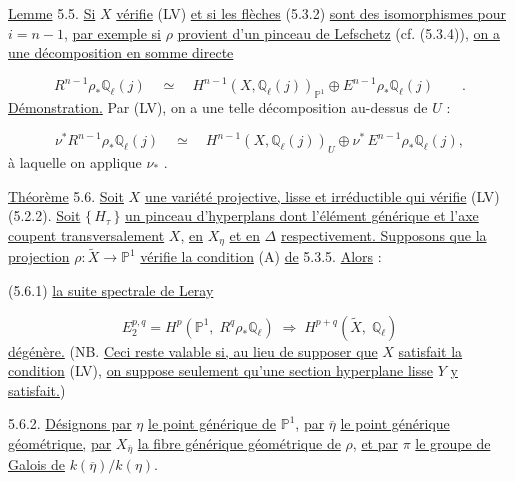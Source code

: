 \underline{Lemme} 5.5. \underline{Si} $X$ \underline{vérifie} (LV) \underline{et si les flèches} (5.3.2) \underline{sont des isomorphismes pour} $i = n - 1$, \underline{par exemple si} $\rho$ \underline{provient d'un pinceau de Lefschetz} (cf. (5.3.4)), \underline{on a une décomposition en somme directe}

\begin{equation}\tag{5.5.1}
R^{n-1}\rho_*\mathbb{Q}_\ell(j) \quad \simeq \quad H^{n-1}(X,\mathbb{Q}_\ell(j))_{\mathbb{P}^1} \oplus E^{n-1}\rho_*\mathbb{Q}_\ell(j) \qquad .
\end{equation}
\underline{Démonstration.} Par (LV), on a une telle décomposition au-dessus de $U$ :

\begin{equation}\tag{5.5.2}
\nu^*R^{n-1}\rho_*\mathbb{Q}_\ell(j) \quad \simeq \quad H^{n-1}(X,\mathbb{Q}_\ell(j))_U \oplus \nu^*\, E^{n-1}\rho_*\mathbb{Q}_\ell(j),
\end{equation}
à laquelle on applique $\nu_*$ .

\underline{Théorème} 5.6. \underline{Soit} $X$ \underline{une variété projective, lisse et irréductible qui vérifie} (LV) (5.2.2). \underline{Soit} $\{\, H_\tau \,\}$ \underline{un pinceau d'hyperplans dont l'élément générique et l'axe coupent transversalement} $X$, \underline{en} $X_\eta$ \underline{et en} $\Delta$ \underline{respectivement. Supposons que la projection} $\rho : \widetilde{X} \longrightarrow \mathbb{P}^1$ \underline{vérifie la condition} (A) \underline{de} 5.3.5. \underline{Alors} :

(5.6.1) \quad \underline{la suite spectrale de Leray}

\begin{equation*}
E_2^{p,q} = H^p(\mathbb{P}^1,\; R^q\rho_*\mathbb{Q}_\ell) \;\Longrightarrow\; H^{p+q}(\widetilde{X},\; \mathbb{Q}_\ell)
\end{equation*}
\underline{dégénère.} (NB. \underline{Ceci reste valable si, au lieu de supposer que} $X$ \underline{satisfait la condition} (LV), \underline{on suppose seulement qu'une section hyperplane lisse} $Y$ \underline{y satisfait.})



5.6.2. \underline{Désignons par} $\eta$ \underline{le point générique de} $\mathbb{P}^1$, \underline{par} $\overline{\eta}$ \underline{le point générique géométrique,} \underline{par} $X_{\overline{\eta}}$ \underline{la fibre générique géométrique de} $\rho$, \underline{et par} $\pi$ \underline{le groupe de Galois de} $k(\overline{\eta})/k(\eta)$.

